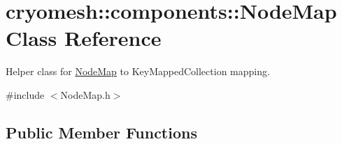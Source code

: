 \hypertarget{classcryomesh_1_1components_1_1NodeMap}{\section{cryomesh\-:\-:components\-:\-:\-Node\-Map \-Class \-Reference}
\label{classcryomesh_1_1components_1_1NodeMap}
}


\-Helper class for \hyperlink{classcryomesh_1_1components_1_1NodeMap}{\-Node\-Map} to \-Key\-Mapped\-Collection mapping.  




{\ttfamily \#include $<$\-Node\-Map.\-h$>$}

\subsection*{\-Public \-Member \-Functions}
